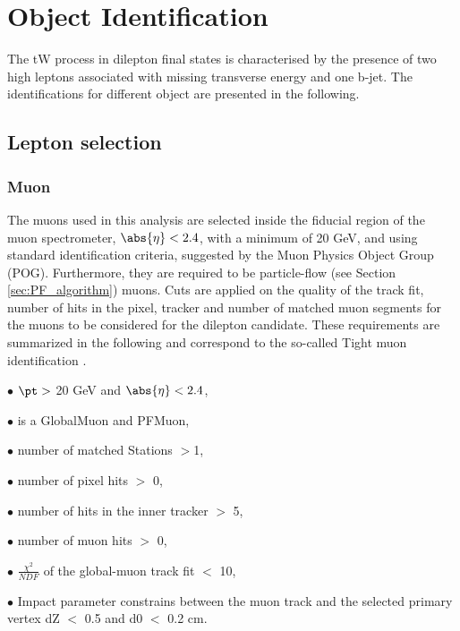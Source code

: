 \clearpage
\section{Object Identification}
\label{tW_Objectselection}
The tW  process in dilepton final states is characterised by the presence of two high \pt leptons associated with missing transverse energy and one b-jet. The identifications for different object are presented in the following.

\subsection{Lepton selection}
\subsubsection{Muon}

The muons used in this analysis  are selected inside the fiducial region of the muon
spectrometer, $\abs{\eta}<  2.4$, with a minimum \pt  of 20 GeV, and using standard identification criteria, suggested by the Muon Physics Object Group (POG). Furthermore, they are required to be particle-flow (see Section \ref{sec:PF_algorithm}) muons.
Cuts are applied on the quality of the track fit, number of hits in the pixel, tracker and number
of matched muon segments for the muons to be considered for the dilepton candidate. These
requirements are summarized in the following and correspond to the so-called Tight muon identification \cite{muonid}.

$\bullet$ $\pt>$ 20 GeV and $\abs{\eta}<  2.4$,

$\bullet$ is a GlobalMuon and PFMuon,

$\bullet$ number of matched Stations $> $1,

$\bullet$ number of pixel hits $>$ 0,

$\bullet$ number of hits in the inner tracker $>$ 5,

$\bullet$ number of muon hits $>$ 0,

$\bullet$ $\frac{\chi^2}{NDF}$ of the global-muon track fit $<$ 10,

$\bullet$ Impact parameter constrains between the muon track and the selected primary vertex dZ $<$ 0.5  and d0 $<$ 0.2 cm.



